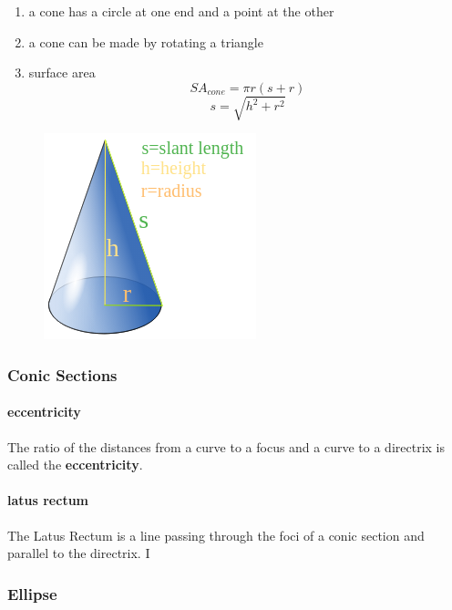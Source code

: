 \begin{enumerate}
    \item a cone has a circle at one end and a point at the other
    \item a cone can be made by rotating a triangle
    \item surface area
    $$SA_{cone} = \pi r(s + r)$$
    $$s = \sqrt{h^2 + r^2}$$
\end{enumerate}

\begin{figure}[h!]
    \begin{center}
        \includegraphics[scale=.45]{./public/images/cone-surface-area}
    \end{center}
\end{figure}


\subsubsection[conics]{Conic Sections}

\paragraph*{eccentricity}

The ratio of the distances from a curve to a focus and a curve to a directrix is called the \textbf{eccentricity}.

\paragraph*{latus rectum}

The Latus Rectum is a line passing through the foci of a conic section and parallel to the directrix. I

\subsubsection[ellipse]{Ellipse}

